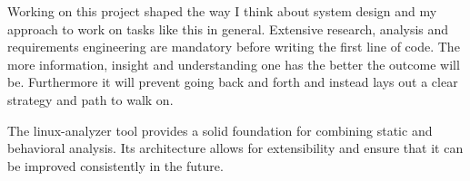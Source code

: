 Working on this project shaped the way I think about system design and my approach to work on tasks like this in general. Extensive research, analysis and requirements engineering are mandatory before writing the first line of code. The more information, insight and understanding one has the better the outcome will be. Furthermore it will prevent going back and forth and instead lays out a clear strategy and path to walk on.\newline

The linux-analyzer tool provides a solid foundation for combining static and behavioral analysis. Its architecture allows for extensibility and ensure that it can be improved consistently in the future.

